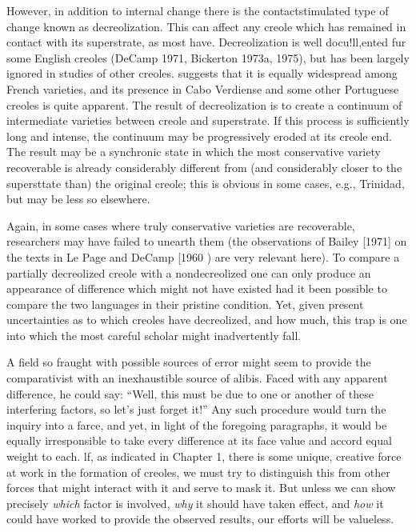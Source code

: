 However, in addition to internal change there is the contact\-stimulated type of change known as decreolization. This can affect any creole which has remained in contact with its superstrate, as most have. Decreolization is well docu!ll,ented fur some English creoles
(DeCamp 1971, Bickerton 1973a, 1975), but has been largely ignored in studies of other creoles. \citet{Valdman1973} suggests that it is equally widespread among French varieties, and its presence in Cabo Verdiense and some other Portuguese creoles is quite apparent. The result of decreolization is to create a continuum of intermediate varieties be\-tween creole and superstrate. If this process is sufficiently long and intense, the continuum may be progressively eroded at its creole end. The result may be a synchronic state in which the most conservative variety recoverable is already considerably different from (and con\-siderably closer to the supersttate than) the original creole; this is obvious in some cases, e.g., Trinidad, but may be less so elsewhere.

Again, in some cases where truly conservative varieties are recoverable, researchers may have failed to unearth them (the obser\-vations of Bailey [1971] on the texts in Le Page and DeCamp [1960 ) are very relevant here). To compare a partially decreolized creole with a nondecreolized one can only produce an appearance of difference which might not have existed had it been possible to compare the two languages in their pristine condition. Yet, given present uncertainties as to which creoles have decreolized, and how much, this trap is one into which the most careful scholar might inadvertently fall.

A field so fraught with possible sources of error might seem to provide the comparativist with an inexhaustible source of alibis. Faced with any apparent difference, he could say: ``Well, this must be due to one or another of these interfering factors, so let's just forget it!'' Any such procedure would turn the inquiry into a farce, and yet, in light of the foregoing paragraphs, it would be equally irresponsible to take every difference at its face value and accord equal weight to each. lf, as indicated in Chapter 1, there is some unique, creative force at work in the formation of creoles, we must try to distinguish this from other forces that might interact with it and serve to mask it. But unless we can show precisely \textit{which} factor is involved, \textit{why} it should have taken
effect, and \textit{how} it could have worked to provide the observed results, our efforts will be valueless.

